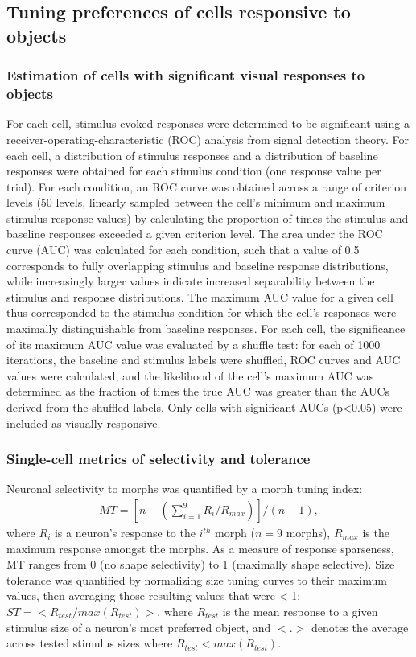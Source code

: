\subsection{Tuning preferences of cells responsive to objects}

\subsubsection{Estimation of cells with significant visual responses to objects}
For each cell, stimulus evoked responses were determined to be significant using a receiver-operating-characteristic (ROC) analysis from signal detection theory\cite{Green1966, Britten1992, Busse2011}. For each cell, a distribution of stimulus responses and a distribution of baseline responses were obtained for each stimulus condition (one response value per trial). For each condition, an ROC curve was obtained across a range of criterion levels (50 levels, linearly sampled between the cell's minimum and maximum stimulus response values) by calculating the proportion of times the stimulus and baseline responses exceeded a given criterion level. The area under the ROC curve (AUC) was calculated for each condition, such that a value of 0.5 corresponds to fully overlapping stimulus and baseline response distributions, while increasingly larger values indicate increased separability between the stimulus and response distributions. The maximum AUC value for a given cell thus corresponded to the stimulus condition for which the cell's responses were maximally distinguishable from baseline responses. For each cell, the significance of its maximum AUC value was evaluated by a shuffle test:  for each of 1000 iterations, the baseline and stimulus labels were shuffled, ROC curves and AUC values were calculated, and the likelihood of the cell's maximum AUC was determined as the fraction of times the true AUC was greater than the AUCs derived from the shuffled labels. Only cells with significant AUCs (p<0.05) were included as visually responsive. 

\subsubsection{Single-cell metrics of selectivity and tolerance}
Neuronal selectivity to morphs was quantified by a morph tuning index\cite{Zoccolan2007}:
\begin{align}
MT=[n-(\sum_{i=1}^{9}R_i/R_{max})]/(n-1), 
\end{align}
where $R_i$ is a neuron’s response to the $i^{th}$ morph ($n=9$ morphs), $R_{max}$ is the maximum response amongst the morphs. As a measure of response sparseness, MT ranges from 0 (no shape selectivity) to 1 (maximally shape selective). Size tolerance was quantified by normalizing size tuning curves to their maximum values, then averaging those resulting values that were < 1:  $ST=<R_{test}/max(R_{test})>$, where $R_{test}$ is the mean response to a given stimulus size of a neuron’s most preferred object, and $<.>$ denotes the average across tested stimulus sizes where $R_{test}<max(R_{test})$\cite{Zoccolan2007}. 

